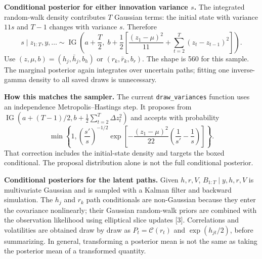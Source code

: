 \documentclass[10pt,a4paper]{article}
\newcommand{\IG}{\operatorname{IG}}
\begin{document}
\textbf{Conditional posterior for either innovation variance $s$.}
The integrated random-walk density contributes $T$ Gaussian terms: the initial state
with variance $11s$ and $T-1$ changes with variance $s$. Therefore
\[
\boxed{s\mid z_{1:T},y,\ldots\sim\IG\left(a+\frac T2,\;
b+\frac12\left[\frac{(z_1-\mu)^2}{11}+
\sum_{t=2}^T(z_t-z_{t-1})^2\right]\right).}
\]
Use $(z,\mu,b)=(h_j,\bar h_j,b_h)$ or $(r_k,\bar r_k,b_r)$.
The shape is 560 for this sample. The marginal posterior again integrates
over uncertain paths; fitting one inverse-gamma density to all saved draws is unnecessary.

\textbf{How this matches the sampler.} The current \texttt{draw\_variances} function uses
an independence Metropolis--Hastings step. It proposes from
$\IG(a+(T-1)/2,b+\tfrac12\sum_{t=2}^T\Delta z_t^2)$ and accepts with probability
\[
\min\left\{1,\left(\frac{s'}s\right)^{-1/2}
\exp\left[-\frac{(z_1-\mu)^2}{22}\left(\frac1{s'}-\frac1s\right)\right]\right\}.
\]
That correction includes the initial-state density and targets the boxed conditional.
The proposal distribution alone is not the full conditional posterior.

\textbf{Conditional posteriors for the latent paths.}
Given $h,r,V$, $B_{1:T}\mid y,h,r,V$ is multivariate Gaussian and is sampled with a
Kalman filter and backward simulation. The $h_j$ and $r_k$ path conditionals are
non-Gaussian because they enter the covariance nonlinearly; their Gaussian random-walk
priors are combined with the observation likelihood using elliptical slice updates [3].
Correlations and volatilities are obtained draw by draw as $P_t=\mathcal C(r_t)$ and
$\exp(h_{jt}/2)$, before summarizing. In general, transforming a posterior mean is not
the same as taking the posterior mean of a transformed quantity.

\clearpage
\end{document}
